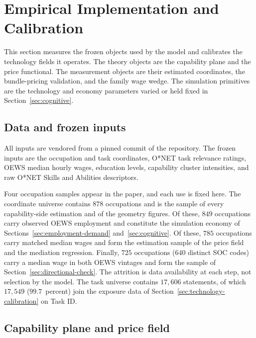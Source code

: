 \documentclass[12pt, a4paper]{article}
\begin{document}
\section{Empirical Implementation and Calibration}
\label{sec:implementation}

This section measures the frozen objects used by the model and
calibrates the technology fields it operates. The theory objects are
the capability plane and the price functional. The measurement objects
are their estimated coordinates, the bundle-pricing validation, and the
family wage wedge. The simulation primitives are the technology and
economy parameters varied or held fixed in Section~\ref{sec:cognitive}.

\subsection{Data and frozen inputs}
\label{sec:frozen-inputs}

All inputs are vendored from a pinned commit of the
\textcite{storck2026geometry} repository. The frozen inputs are the
occupation and task coordinates, O*NET task relevance ratings, OEWS
median hourly wages, education levels, capability cluster intensities,
and raw O*NET Skills and Abilities descriptors.

Four occupation samples appear in the paper, and each use is fixed
here. The coordinate universe contains $878$ occupations and is the
sample of every capability-side estimation and of the geometry figures.
Of these, $849$ occupations carry observed OEWS employment and
constitute the simulation economy of Sections~\ref{sec:employment-demand}
and~\ref{sec:cognitive}. Of these, $785$ occupations carry matched median
wages and form the estimation sample of the price field and the
mediation regression. Finally, $725$ occupations ($640$ distinct SOC
codes) carry a median wage in both OEWS vintages and form the sample of
Section~\ref{sec:directional-check}. The attrition is data
availability at each step, not selection by the model. The task
universe contains $17{,}606$ statements, of which $17{,}549$
($99.7$~percent) join the exposure data of
Section~\ref{sec:technology-calibration} on Task ID.

\subsection{Capability plane and price field}
\label{sec:implementation-plane-price}
\end{document}
